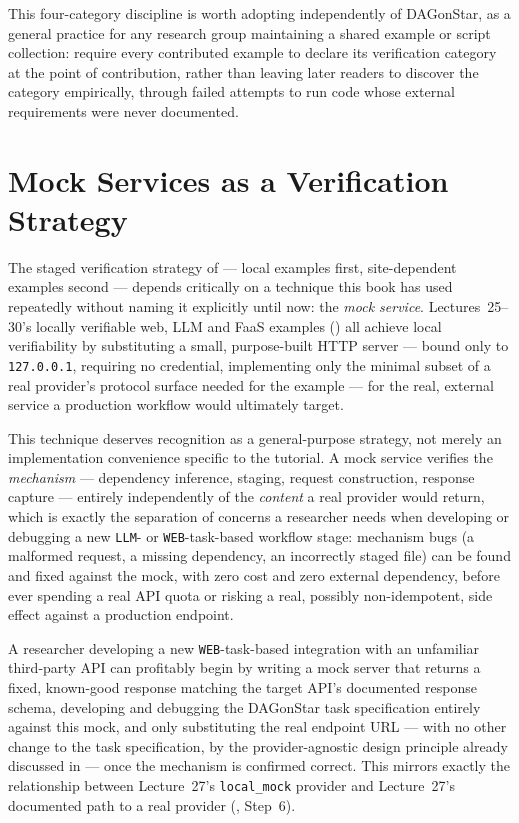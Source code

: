 \begin{practicebox}
This four-category discipline is worth adopting independently of DAGonStar,
as a general practice for any research group maintaining a shared example or
script collection: require every contributed example to declare its
verification category at the point of contribution, rather than leaving
later readers to discover the category empirically, through failed attempts
to run code whose external requirements were never documented.
\end{practicebox}

\section{Mock Services as a Verification Strategy}

The staged verification strategy of  --- local
examples first, site-dependent examples second --- depends critically on a
technique this book has used repeatedly without naming it explicitly until
now: the \emph{mock service}. Lectures~25--30's locally verifiable web, LLM and FaaS
examples () all achieve local
verifiability by substituting a small, purpose-built HTTP server --- bound
only to \texttt{127.0.0.1}, requiring no credential, implementing only the
minimal subset of a real provider's protocol surface needed for the
example --- for the real, external service a production workflow would
ultimately target.

This technique deserves recognition as a general-purpose strategy, not
merely an implementation convenience specific to the tutorial. A mock
service verifies the \emph{mechanism} --- dependency inference, staging,
request construction, response capture --- entirely independently of the
\emph{content} a real provider would return, which is exactly the
separation of concerns a researcher needs when developing or debugging a
new \texttt{LLM}- or \texttt{WEB}-task-based workflow stage: mechanism bugs
(a malformed request, a missing dependency, an incorrectly staged file) can
be found and fixed against the mock, with zero cost and zero external
dependency, before ever spending a real API quota or risking a real,
possibly non-idempotent, side effect against a production endpoint.

\begin{example}
A researcher developing a new \texttt{WEB}-task-based integration with an
unfamiliar third-party API can profitably begin by writing a mock server
that returns a fixed, known-good response matching the target API's
documented response schema, developing and debugging the DAGonStar task
specification entirely against this mock, and only substituting the real
endpoint URL --- with no other change to the task specification, by the
provider-agnostic design principle already discussed in
 --- once the mechanism is confirmed correct. This
mirrors exactly the relationship between Lecture~27's \texttt{local\_mock}
provider and Lecture~27's documented path to a real provider
(, Step~6).
\end{example}

